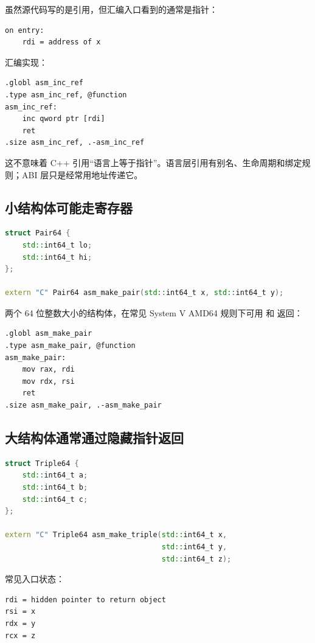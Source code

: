 虽然源代码写的是引用，但汇编入口看到的通常是指针：

\begin{lstlisting}
on entry:
    rdi = address of x
\end{lstlisting}

汇编实现：

\begin{lstlisting}
.globl asm_inc_ref
.type asm_inc_ref, @function
asm_inc_ref:
    inc qword ptr [rdi]
    ret
.size asm_inc_ref, .-asm_inc_ref
\end{lstlisting}

这不意味着 C++ 引用“语言上等于指针”。语言层引用有别名、生命周期和绑定规则；ABI 层只是经常用地址传递它。

\subsection{小结构体可能走寄存器}

\begin{lstlisting}[language=C++]
struct Pair64 {
    std::int64_t lo;
    std::int64_t hi;
};

extern "C" Pair64 asm_make_pair(std::int64_t x, std::int64_t y);
\end{lstlisting}

两个 64 位整数大小的结构体，在常见 System V AMD64 规则下可用  和  返回：

\begin{lstlisting}
.globl asm_make_pair
.type asm_make_pair, @function
asm_make_pair:
    mov rax, rdi
    mov rdx, rsi
    ret
.size asm_make_pair, .-asm_make_pair
\end{lstlisting}

\subsection{大结构体通常通过隐藏指针返回}

\begin{lstlisting}[language=C++]
struct Triple64 {
    std::int64_t a;
    std::int64_t b;
    std::int64_t c;
};

extern "C" Triple64 asm_make_triple(std::int64_t x,
                                    std::int64_t y,
                                    std::int64_t z);
\end{lstlisting}

常见入口状态：

\begin{lstlisting}
rdi = hidden pointer to return object
rsi = x
rdx = y
rcx = z
\end{lstlisting}

